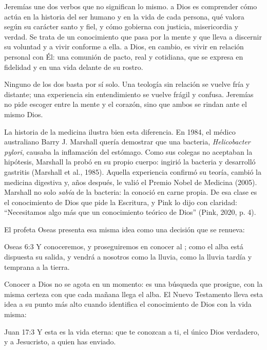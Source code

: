 Jeremías une dos verbos que no significan lo mismo.  a Dios es comprender cómo actúa en la historia del ser humano y en la vida de cada persona, qué valora según su carácter santo y fiel, y cómo gobierna con justicia, misericordia y verdad. Se trata de un conocimiento que pasa por la mente y que lleva a discernir su voluntad y a vivir conforme a ella.  a Dios, en cambio, es vivir en relación personal con Él: una comunión de pacto, real y cotidiana, que se expresa en fidelidad y en una vida delante de su rostro.

Ninguno de los dos basta por sí solo. Una teología sin relación se vuelve fría y distante; una experiencia sin entendimiento se vuelve frágil y confusa. Jeremías no pide escoger entre la mente y el corazón, sino que ambos se rindan ante el mismo Dios.

La historia de la medicina ilustra bien esta diferencia. En 1984, el médico australiano Barry J. Marshall quería demostrar que una bacteria, \emph{Helicobacter pylori}, causaba la inflamación del estómago. Como sus colegas no aceptaban la hipótesis, Marshall la probó en su propio cuerpo: ingirió la bacteria y desarrolló gastritis (Marshall et al., 1985). Aquella experiencia confirmó su teoría, cambió la medicina digestiva y, años después, le valió el Premio Nobel de Medicina (2005). Marshall no solo \emph{sabía} de la bacteria: la conoció en carne propia. De esa clase es el conocimiento de Dios que pide la Escritura, y Pink lo dijo con claridad: “Necesitamos algo más que un conocimiento teórico de Dios” (Pink, 2020, p. 4).

El profeta Oseas presenta esa misma idea como una decisión que se renueva:

\begin{verso}{Oseas 6:3}
Y conoceremos, y proseguiremos en conocer al \SENOR; como el alba está dispuesta su salida, y vendrá a nosotros como la lluvia, como la lluvia tardía y temprana a la tierra.
\end{verso}

Conocer a Dios no se agota en un momento: es una búsqueda que prosigue, con la misma certeza con que cada mañana llega el alba. El Nuevo Testamento lleva esta idea a su punto más alto cuando identifica el conocimiento de Dios con la vida misma:

\begin{verso}{Juan 17:3}
Y esta es la vida eterna: que te conozcan a ti, el único Dios verdadero, y a Jesucristo, a quien has enviado.
\end{verso}

